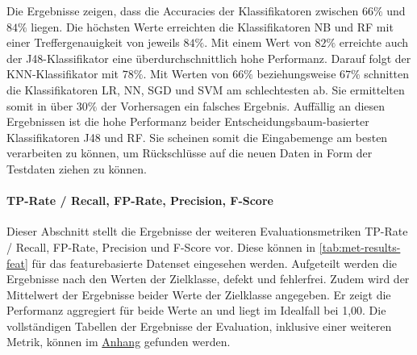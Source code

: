 Die Ergebnisse zeigen, dass die Accuracies der Klassifikatoren zwischen $66\%$ und $84\%$ liegen. Die höchsten Werte erreichten die Klassifikatoren NB und RF mit einer Treffergenauigkeit von jeweils $84\%$. Mit einem Wert von $82\%$ erreichte auch der J48-Klassifikator eine überdurchschnittlich hohe Performanz. Darauf folgt der KNN-Klassifikator mit $78\%$. Mit Werten von $66\%$ beziehungsweise $67\%$ schnitten die Klassifikatoren LR, NN, SGD und SVM am schlechtesten ab. Sie ermittelten somit in über $30\%$ der Vorhersagen ein falsches Ergebnis. Auffällig an diesen Ergebnissen ist die hohe Performanz beider Entscheidungsbaum-basierter Klassifikatoren J48 und RF. Sie scheinen somit die Eingabemenge am besten verarbeiten zu können, um Rückschlüsse auf die neuen Daten in Form der Testdaten ziehen zu können.

\paragraph{TP-Rate / Recall, FP-Rate, Precision, F-Score}
Dieser Abschnitt stellt die Ergebnisse der weiteren Evaluationsmetriken TP-Rate / Recall, FP-Rate, Precision und F-Score vor. Diese können in \autoref{tab:met-results-feat} für das featurebasierte Datenset eingesehen werden. Aufgeteilt werden die Ergebnisse nach den Werten der Zielklasse, \glqq defekt\grqq{} und \glqq fehlerfrei\grqq. Zudem wird der Mittelwert der Ergebnisse beider Werte der Zielklasse angegeben. Er zeigt die Performanz aggregiert für beide Werte an und liegt im Idealfall bei 1,00. Die vollständigen Tabellen der Ergebnisse der Evaluation, inklusive einer weiteren Metrik, können im \hyperref[appendix3]{Anhang} gefunden werden.

